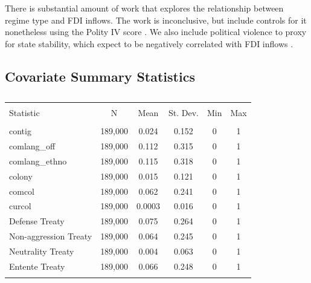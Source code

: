 \documentclass{article}
\begin{document}
There is substantial amount of work that explores the relationship between regime type and FDI inflows. The work is inconclusive, but include controls for it nonetheless using the Polity IV score \citep{polity2012polity}. We also include political violence to proxy for state stability, which expect to be negatively correlated with FDI inflows \citep{marshall2005major}.
\newpage
\subsection{Covariate Summary Statistics}

\begin{table}[!htbp] \centering 
  \caption{} 
  \label{} 
\begin{tabular}{@{\extracolsep{5pt}}lccccc} 
\\[-1.8ex]\hline 
\hline \\[-1.8ex] 
Statistic & \multicolumn{1}{c}{N} & \multicolumn{1}{c}{Mean} & \multicolumn{1}{c}{St. Dev.} & \multicolumn{1}{c}{Min} & \multicolumn{1}{c}{Max} \\ 
\hline \\[-1.8ex] 
contig & 189,000 & 0.024 & 0.152 & 0 & 1 \\ 
comlang\_off & 189,000 & 0.112 & 0.315 & 0 & 1 \\ 
comlang\_ethno & 189,000 & 0.115 & 0.318 & 0 & 1 \\ 
colony & 189,000 & 0.015 & 0.121 & 0 & 1 \\ 
comcol & 189,000 & 0.062 & 0.241 & 0 & 1 \\ 
curcol & 189,000 & 0.0003 & 0.016 & 0 & 1 \\  
Defense Treaty & 189,000 & 0.075 & 0.264 & 0 & 1 \\ 
Non-aggression Treaty & 189,000 & 0.064 & 0.245 & 0 & 1 \\ 
Neutrality Treaty & 189,000 & 0.004 & 0.063 & 0 & 1 \\ 
Entente Treaty & 189,000 & 0.066 & 0.248 & 0 & 1 \\ 
\hline \\[-1.8ex] 
\end{tabular} 
\end{table} 



\newpage
\end{document}
